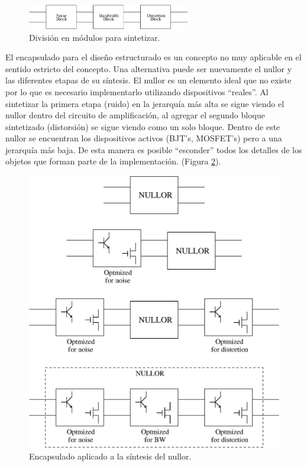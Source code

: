 \documentclass[10pt,twocolumn,twoside,letterpaper]{IEEEtran}
\begin{document}
{\begin{figure}[hbtp]
	\centering
	\includegraphics[height=.65in,width=2.8in]{figures/basic_blocks.eps}
	\caption{Divisi\'on en m\'odulos para sintetizar.}
	\label{fig:nullor_1}
\end{figure}

El encapsulado para el dise\~no estructurado es un concepto no muy aplicable en el sentido estricto del concepto. Una alternativa puede ser nuevamente el nullor y las diferentes etapas de su s\'intesis. El nullor es un elemento ideal que no existe  por lo que es necesario implementarlo utilizando dispositivos ``reales''. Al sintetizar la primera etapa (ruido) en la jerarqu\'ia m\'as alta se sigue viendo el nullor dentro del circuito de amplificaci\'on, al agregar el segundo bloque sintetizado (distorsi\'on) se sigue viendo como un solo bloque. Dentro de este nullor se encuentran los dispositivos activos (BJT's, MOSFET's) pero a una jerarqu\'ia m\'as baja. De esta manera es posible ``esconder'' todos los detalles de los objetos que forman parte de la implementaci\'on. (Figura \ref{fig:nullor}).

\begin{figure}[hbtp]
	\centering
	\includegraphics[scale=.5]{figures/synthesis_process.eps}
	\caption{Encapsulado aplicado a la s\'intesis del nullor.}
	\label{fig:nullor}
\end{figure}

}
\end{document}
